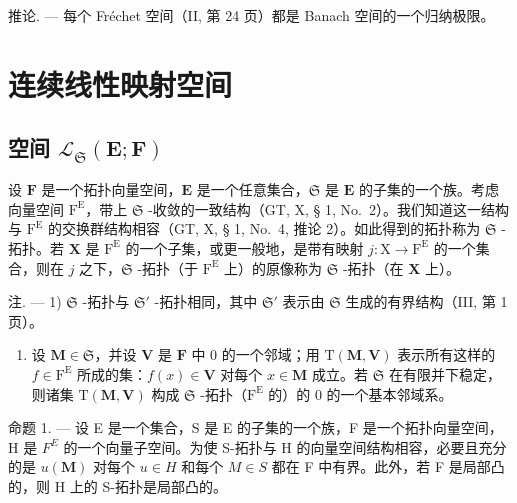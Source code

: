 推论. --- 每个 Fréchet 空间（II, 第 24 页）都是 Banach 空间的一个归纳极限。

\section{连续线性映射空间}

\subsection{\texorpdfstring{空间 \(\mathcal{L}_{\mathfrak{S}}(\mathbf{E};\mathbf{F})\)}{空间 \textbackslash mathcal\{L\}\_\{\textbackslash mathfrak\{S\}\}(\textbackslash mathbf\{E\};\textbackslash mathbf\{F\})}}

设 \(\mathbf{F}\) 是一个拓扑向量空间，\(\mathbf{E}\) 是一个任意集合，\(\mathfrak{S}\) 是 \(\mathbf{E}\) 的子集的一个族。考虑向量空间 \(\mathrm{F}^{\mathrm{E}}\)，带上 \(\mathfrak{S}\) -收敛的一致结构（GT, X, § 1, No.~2）。我们知道这一结构与 \(\mathrm{F}^{\mathrm{E}}\) 的交换群结构相容（GT, X, § 1, No.~4, 推论 2）。如此得到的拓扑称为 \(\mathfrak{S}\) -拓扑。若 \(\mathbf{X}\) 是 \(\mathrm{F}^{\mathrm{E}}\) 的一个子集，或更一般地，是带有映射 \(j: \mathrm{X} \to \mathrm{F}^{\mathrm{E}}\) 的一个集合，则在 \(j\) 之下，\(\mathfrak{S}\) -拓扑（于 \(\mathrm{F}^{\mathrm{E}}\) 上）的原像称为 \(\mathfrak{S}\) -拓扑（在 \(\mathbf{X}\) 上）。

注. --- 1) \(\mathfrak{S}\) -拓扑与 \(\mathfrak{S}'\) -拓扑相同，其中 \(\mathfrak{S}'\) 表示由 \(\mathfrak{S}\) 生成的有界结构（III, 第 1 页）。

\begin{enumerate}
\def\labelenumi{\arabic{enumi})}
\setcounter{enumi}{1}
\tightlist
\item
  设 \(\mathbf{M} \in \mathfrak{S}\)，并设 \(\mathbf{V}\) 是 \(\mathbf{F}\) 中 0 的一个邻域；用 \(\mathrm{T}(\mathbf{M}, \mathbf{V})\) 表示所有这样的 \(f \in \mathrm{F}^{\mathrm{E}}\) 所成的集：\(f(x) \in \mathbf{V}\) 对每个 \(x \in \mathbf{M}\) 成立。若 \(\mathfrak{S}\) 在有限并下稳定，则诸集 \(\mathrm{T}(\mathbf{M}, \mathbf{V})\) 构成 \(\mathfrak{S}\) -拓扑（\(\mathrm{F}^{\mathrm{E}}\) 的）的 0 的一个基本邻域系。
\end{enumerate}

命题 1. --- 设 E 是一个集合，S 是 E 的子集的一个族，F 是一个拓扑向量空间，H 是 \(F^{E}\) 的一个向量子空间。为使 S-拓扑与 H 的向量空间结构相容，必要且充分的是 \(u(\mathbf{M})\) 对每个 \(u \in H\) 和每个 \(M \in S\) 都在 F 中有界。此外，若 F 是局部凸的，则 H 上的 S-拓扑是局部凸的。

